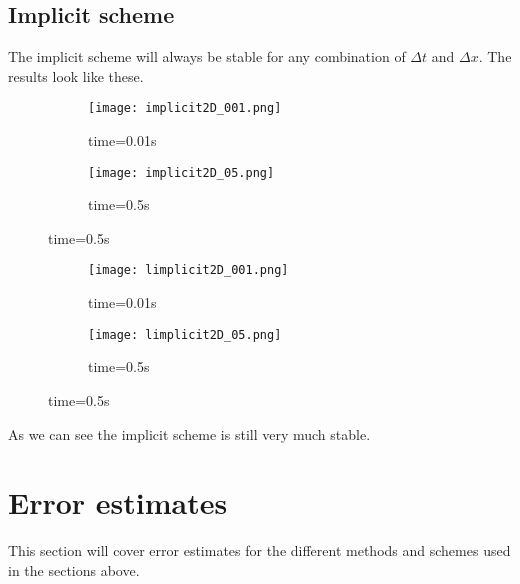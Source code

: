 \documentclass[a4paper,11pt]{article}
\newcommand{\secti}[1]{\centering \section{{#1}} \justifying} %
\begin{document}
\subsection{Implicit scheme}
    The implicit scheme will always be stable for any combination of $\Delta t$ and $\Delta x$. The results look like these.
    
    \begin{figure}[H]
        \caption{Implicit scheme $\Delta t=0.00005$}
        \captionsetup[subfigure]{labelformat=empty}
        \begin{subfigure}[b!]{0.55\textwidth}
            \texttt{[image: implicit2D\_001.png]}
            \caption{time=0.01s}
        \end{subfigure}
        \begin{subfigure}[b!]{0.55\textwidth}
            \texttt{[image: implicit2D\_05.png]}
            \caption{time=0.5s}
        \end{subfigure}
    \end{figure}
    \begin{figure}[h]
        \caption{Implicit scheme $\Delta t=0.005$}
        \captionsetup[subfigure]{labelformat=empty}
        \begin{subfigure}[b!]{0.55\textwidth}
            \texttt{[image: limplicit2D\_001.png]}
            \caption{time=0.01s}
        \end{subfigure}
        \begin{subfigure}[b!]{0.55\textwidth}
            \texttt{[image: limplicit2D\_05.png]}
            \caption{time=0.5s}
        \end{subfigure}
    \end{figure}
    
    As we can see the implicit scheme is still very much stable.

\secti{Error estimates}
    This section will cover error estimates for the different methods and schemes used in the sections above.
\end{document}
